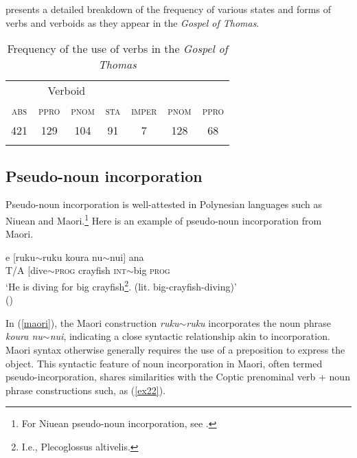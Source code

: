 \documentclass[output=paper,colorlinks,citecolor=brown ,chinesefont]{langscibook}
\begin{document}
 presents a detailed breakdown of the frequency of various states and forms of verbs and verboids as they appear in the \textit{Gospel of Thomas}.

\begin{table}
    \centering
    \begin{tabular}{ccccccc}\lsptoprule
          \multicolumn{5}{c}{Verb} & \multicolumn{2}{c}{Verboid} \\
          \textsc{abs} &	\textsc{ppro} &	\textsc{pnom} &	\textsc{sta} &	\textsc{imper}	& \textsc{pnom} &	\textsc{ppro} \\\midrule
         421 &	129	& 104 &	91 &	7 &	128 &	68 \\\lspbottomrule
    \end{tabular}
    \caption{Frequency of the use of verbs in the \textit{Gospel of Thomas}}
    \label{tab:freqverb}
\end{table}


\subsection{Pseudo-noun incorporation}

Pseudo-noun incorporation is well-attested in Polynesian languages such as Niuean and Maori.\footnote{For Niuean pseudo-noun incorporation, see \citet{massam}.}   Here is an example of pseudo-noun incorporation from Maori.

\begin{exe}
    \ex\label{maori} 
    \settowidth {}
    \gll e	[ruku$\sim$ruku	koura		nu$\sim$nui]		ana \\
    T/A	[dive$\sim$\textsc{prog}	crayfish 	\textsc{int}$\sim$big		\textsc{prog} \\ 
    \glt ‘He is diving for big crayfish\footnote{I.e., Plecoglossus altivelis.}. (lit. big-crayfish-diving)' \\
    \hspace*{\fill}(\citet[39]{collberg})
\end{exe}

In (\ref{maori}), the Maori construction \textit{ruku$\sim$ruku} incorporates the noun phrase \textit{koura nu$\sim$nui}, indicating a close syntactic relationship akin to incorporation. Maori syntax otherwise generally requires the use of a preposition to express the object. This syntactic feature of noun incorporation in Maori, often termed pseudo-incorporation, shares similarities with the Coptic prenominal verb + noun phrase constructions such, as (\ref{ex22}). 
\end{document}
